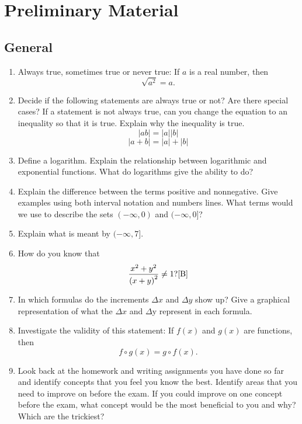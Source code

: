 \chapter{Preliminary Material }

\section{General}
\begin{enumerate}


\item Always true, sometimes true or never true:  If $a$ is a real number, then $$\sqrt {a^2 }  = a.$$

\item Decide if the following statements are always true or not?  Are there special cases?  If a statement is not always true, can you change the equation to an inequality so that it is true.  Explain why the inequality is true.    $$\left| {ab} \right| = \left| a \right|\left| b \right|$$  $$\left| {a + b} \right| = \left| a \right| + \left| b \right|$$

\item Define a logarithm.  Explain the relationship between logarithmic and exponential functions.  What do logarithms give the ability to do?  

\item Explain the difference between the terms positive and nonnegative.  Give examples using both interval notation and numbers lines.  What terms would we use to describe the sets $(-\infty, 0)$ and $(-\infty, 0]$?

\item Explain what is meant by $(-\infty, 7]$.

\item How do you know that $${{x^2  + y^2 } \over {\left( {x + y} \right)^2 }} \ne 1? \cite{B}$$  

\item In which formulas do the increments $\Delta x$ and $\Delta y$ show up?  Give a graphical representation of what the $\Delta x$ and $\Delta $y represent in each formula.  

\item Investigate the validity of this statement:  If $f(x)$ and $g(x)$ are functions, then $$f \circ g\left( x \right) = g \circ f\left( x \right).$$

\item Look back at the homework and writing assignments you have done so far and identify concepts that you feel you know the best.  Identify areas that you need to improve on before the exam.  If you could improve on one concept before the exam, what concept would be the most beneficial to you and why? Which are the trickiest? 



\end{enumerate}

